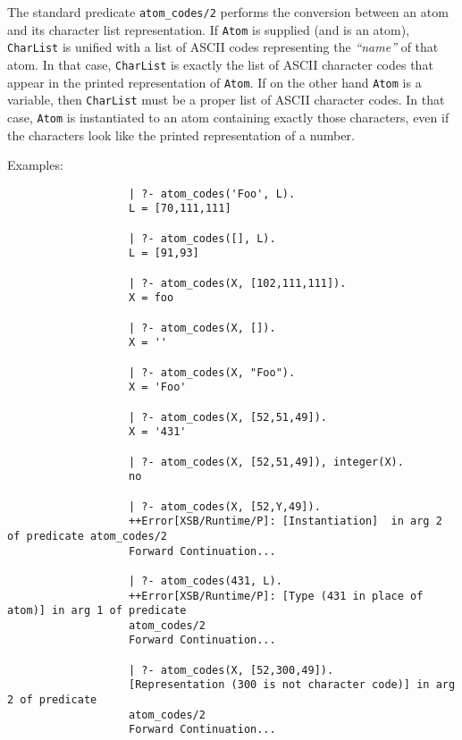 \begin{description}

    The standard predicate {\tt atom\_codes/2} performs the conversion 
    between an atom and its character list representation. 
    If {\tt Atom} is supplied (and is an atom), {\tt CharList} 
    is unified with a list of ASCII codes representing the {\em ``name''} 
    of that atom.  In that case, {\tt CharList} is exactly the list of 
    ASCII character codes that appear in the printed representation of 
    {\tt Atom}.  If on the other hand {\tt Atom} is a variable, 
    then {\tt CharList} must be a proper list of ASCII character codes. 
    In that case, {\tt Atom} is instantiated to an atom containing
    exactly those characters, even if the characters look like the
    printed representation of a number.

    Examples:
    {\footnotesize
     \begin{verbatim}
                   | ?- atom_codes('Foo', L).
                   L = [70,111,111]

                   | ?- atom_codes([], L).
                   L = [91,93]

                   | ?- atom_codes(X, [102,111,111]).
                   X = foo
 
                   | ?- atom_codes(X, []).
                   X = ''

                   | ?- atom_codes(X, "Foo").
                   X = 'Foo'

                   | ?- atom_codes(X, [52,51,49]).
                   X = '431'

                   | ?- atom_codes(X, [52,51,49]), integer(X).
                   no

                   | ?- atom_codes(X, [52,Y,49]).
                   ++Error[XSB/Runtime/P]: [Instantiation]  in arg 2 of predicate atom_codes/2
                   Forward Continuation...

                   | ?- atom_codes(431, L).
                   ++Error[XSB/Runtime/P]: [Type (431 in place of atom)] in arg 1 of predicate 
                   atom_codes/2
                   Forward Continuation...

                   | ?- atom_codes(X, [52,300,49]).
                   [Representation (300 is not character code)] in arg 2 of predicate 
                   atom_codes/2
                   Forward Continuation...
     \end{verbatim}}


\end{description}
